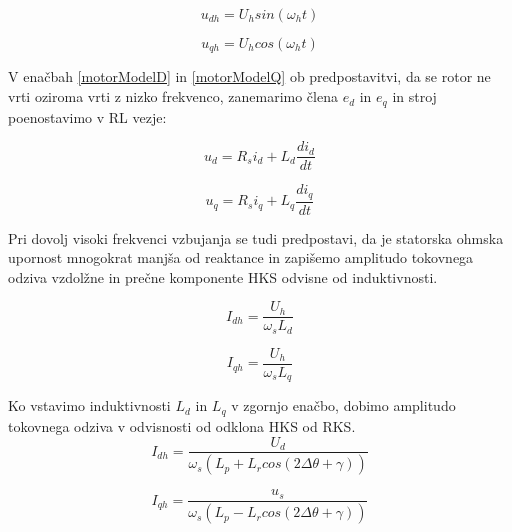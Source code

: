 \documentclass[a4paper,twoside,openright,12pt,slovene]{book}
\begin{document}
\begin{equation} \label{udh}
    u_{dh} = U_hsin(\omega_ht)
\end{equation}

\begin{equation} \label{uqh}
    u_{qh} = U_hcos(\omega_ht)
\end{equation}

V enačbah \ref{motorModelD} in \ref{motorModelQ} ob predpostavitvi, da se rotor ne vrti oziroma vrti z nizko frekvenco, zanemarimo člena $e_d$ in $e_q$ in stroj poenostavimo v RL vezje:

\begin{equation}
    u_d = R_si_d+L_d\frac{di_d}{dt}
\end{equation}

\begin{equation}
    u_q = R_si_q+L_q\frac{di_q}{dt}
\end{equation}


Pri dovolj visoki frekvenci vzbujanja se tudi predpostavi, da je statorska ohmska upornost mnogokrat manjša od reaktance in zapišemo amplitudo tokovnega odziva vzdolžne in prečne komponente HKS
odvisne od induktivnosti.

\begin{equation}
    I_{dh} = \frac{U_h}{\omega_sL_{d}}
\end{equation}

\begin{equation}
    I_{qh} = \frac{U_h}{\omega_sL_{q}}
\end{equation}

Ko vstavimo induktivnosti $L_{d}$ in $L_{q}$ v zgornjo enačbo, dobimo amplitudo tokovnega odziva v odvisnosti od odklona HKS od RKS.
\begin{equation} \label{tokovniOdzivEnacbaD}
    I_{dh} = \frac{U_d}{\omega_s (L_p + L_r cos(2\Delta\theta + \gamma))}
\end{equation}

\begin{equation}\label{tokovniOdzivEnacbaQ}
    I_{qh} = \frac{u_s}{\omega_s (L_p - L_r cos(2\Delta\theta + \gamma))}
\end{equation}
\end{document}
